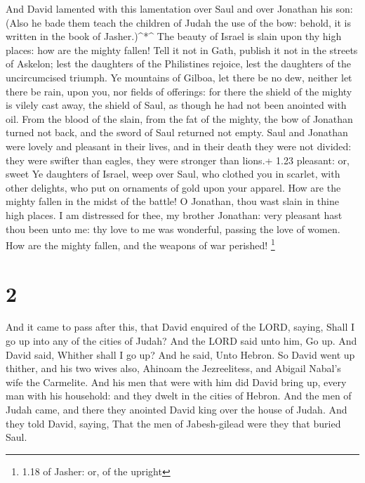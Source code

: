  And David lamented with this lamentation over Saul and
over Jonathan his son:  (Also he bade them teach the
children of Judah the use of the bow: behold, it is written in the book
of Jasher.)\^{}*\^{}  The beauty of Israel is slain upon
thy high places: how are the mighty fallen!  Tell it not in
Gath, publish it not in the streets of Askelon; lest the daughters of
the Philistines rejoice, lest the daughters of the uncircumcised
triumph.  Ye mountains of Gilboa, let there be no dew,
neither let there be rain, upon you, nor fields of offerings: for there
the shield of the mighty is vilely cast away, the shield of Saul, as
though he had not been anointed with oil.  From the blood
of the slain, from the fat of the mighty, the bow of Jonathan turned not
back, and the sword of Saul returned not empty.  Saul and
Jonathan were lovely and pleasant in their lives, and in their death
they were not divided: they were swifter than eagles, they were stronger
than lions.+ 1.23 pleasant: or, sweet  Ye daughters of
Israel, weep over Saul, who clothed you in scarlet, with other delights,
who put on ornaments of gold upon your apparel.  How are
the mighty fallen in the midst of the battle! O Jonathan, thou wast
slain in thine high places.  I am distressed for thee, my
brother Jonathan: very pleasant hast thou been unto me: thy love to me
was wonderful, passing the love of women.  How are the
mighty fallen, and the weapons of war perished! \footnote{1.18 of
  Jasher: or, of the upright}

\hypertarget{section-1}{%
\section{2}\label{section-1}}

 And it came to pass after this, that David enquired of the
LORD, saying, Shall I go up into any of the cities of Judah? And the
LORD said unto him, Go up. And David said, Whither shall I go up? And he
said, Unto Hebron.  So David went up thither, and his two
wives also, Ahinoam the Jezreelitess, and Abigail Nabal's wife the
Carmelite.  And his men that were with him did David bring
up, every man with his household: and they dwelt in the cities of
Hebron.  And the men of Judah came, and there they anointed
David king over the house of Judah. And they told David, saying, That
the men of Jabesh-gilead were they that buried Saul.

